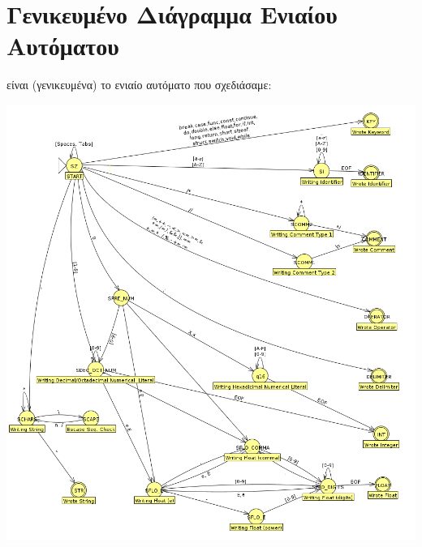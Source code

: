 \documentclass[14pt]{extarticle}
\begin{document}
\section{Γενικευμένο Διάγραμμα Ενιαίου Αυτόματου}
 είναι (γενικευμένα) το ενιαίο αυτόματο που σχεδιάσαμε:
  \begin{center}
\includegraphics[scale=0.45]{automata_general.png}
  \end{center}
   
\end{document}
